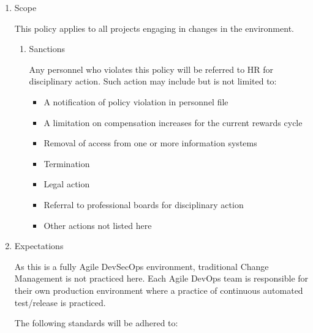 \documentclass[stu]{apa7}
\begin{document}
\begin{enumerate}
\item Scope
\label{sec:org4182db6}

This policy applies to all projects engaging in changes in the environment.

\begin{enumerate}
\item Sanctions
\label{sec:org97a93f3}

Any personnel who violates this policy will be referred to HR for disciplinary action. Such action may include but is not limited to:

\begin{itemize}
\item A notification of policy violation in personnel file
\item A limitation on compensation increases for the current rewards cycle
\item Removal of access from one or more information systems
\item Termination
\item Legal action
\item Referral to professional boards for disciplinary action
\item Other actions not listed here
\end{itemize}
\end{enumerate}

\item Expectations
\label{sec:org7c17f17}


As this is a fully Agile DevSecOps environment, traditional Change Management is not practiced here. Each Agile DevOps team is responsible for their own production environment where a practice of continuous automated test/release is practiced.

The following standards will be adhered to:


\end{enumerate}
\end{document}
